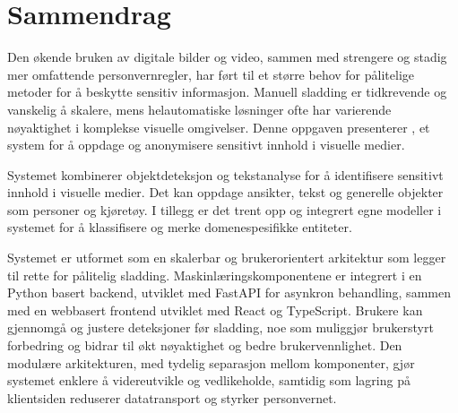 \chapter*{Sammendrag}

Den økende bruken av digitale bilder og video, sammen med strengere og stadig mer omfattende personvernregler, har ført til et større behov for pålitelige metoder for å beskytte sensitiv informasjon. Manuell sladding er tidkrevende og vanskelig å skalere, mens helautomatiske løsninger ofte har varierende nøyaktighet i komplekse visuelle omgivelser. Denne oppgaven presenterer , et system for å oppdage og anonymisere sensitivt innhold i visuelle medier.

Systemet kombinerer objektdeteksjon og tekstanalyse for å identifisere sensitivt innhold i visuelle medier. Det kan oppdage ansikter, tekst og generelle objekter som personer og kjøretøy. I tillegg er det trent opp og integrert egne modeller i systemet for å klassifisere og merke domenespesifikke entiteter.

Systemet er utformet som en skalerbar og brukerorientert arkitektur som legger til rette for pålitelig sladding. Maskinlæringskomponentene er integrert i en Python basert backend, utviklet med FastAPI for asynkron behandling, sammen med en webbasert frontend utviklet med React og TypeScript. Brukere kan gjennomgå og justere deteksjoner før sladding, noe som muliggjør brukerstyrt forbedring og bidrar til økt nøyaktighet og bedre brukervennlighet. Den modulære arkitekturen, med tydelig separasjon mellom komponenter, gjør systemet enklere å videreutvikle og vedlikeholde, samtidig som lagring på klientsiden reduserer datatransport og styrker personvernet.